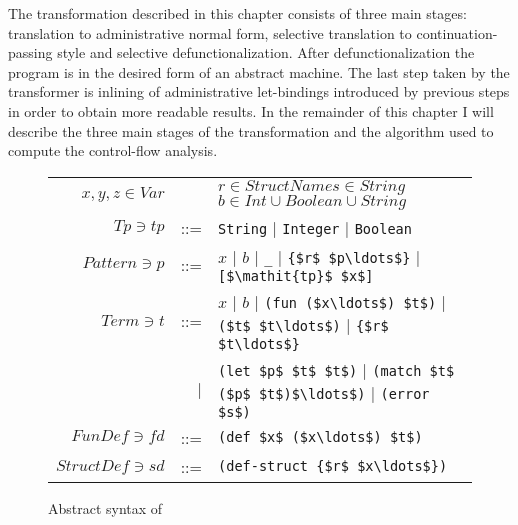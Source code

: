 The transformation described in this chapter consists of three main stages: translation to administrative normal form, selective translation to continuation-passing style and selective defunctionalization.
After defunctionalization the program is in the desired form of an abstract machine.
The last step taken by the transformer is inlining of administrative let-bindings introduced by previous steps in order to obtain more readable results.
In the remainder of this chapter I will describe the three main stages of the transformation and the algorithm used to compute the control-flow analysis.


\begin{figure}
\begin{center}
\begingroup
\setlength{\tabcolsep}{2pt}
\begin{tabular}{rrl}
  $x, y, z \in Var$ && $r\in StructName$\quad$s \in String$ \quad $b \in Int \cup Boolean \cup String$\\
  $Tp \ni \mathit{tp} $ &::=& \lstinline!String! | \lstinline!Integer! | \lstinline!Boolean!\\
  $Pattern \ni p $ &::=& $x$ | $b$ | \lstinline!_! | \lstinline!{$r$ $p\ldots$}! |  \lstinline![$\mathit{tp}$ $x$]!\\
  $Term \ni t$ &::=& $x$ | $b$
              | \lstinline!(fun ($x\ldots$) $t$)!
              | \lstinline!($t$ $t\ldots$)!
              | \lstinline!{$r$ $t\ldots$}!\\
              &|& \lstinline!(let $p$ $t$ $t$)!
              | \lstinline!(match $t$ ($p$ $t$)$\ldots$)!
              | \lstinline!(error $s$)!\\
  $FunDef \ni \mathit{fd}$ &::=& \lstinline!(def $x$ ($x\ldots$) $t$)!\\
  $StructDef \ni \mathit{sd}$ &::=& \lstinline!(def-struct {$r$ $x\ldots$})!\\
\end{tabular}
\endgroup
\end{center}
\caption{Abstract syntax of \IDL{}}\label{fig:idl-abs-syntax}
\end{figure}


